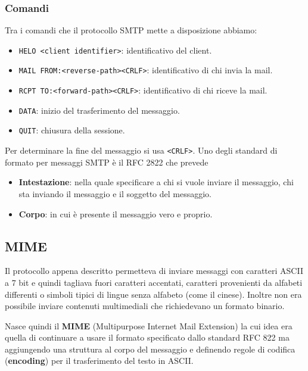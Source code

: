 \subsubsection{Comandi}
Tra i comandi che il protocollo SMTP mette a disposizione abbiamo:
\begin{itemize}
	\item \verb|HELO <client identifier>|: identificativo del client.
	\item \verb|MAIL FROM:<reverse-path><CRLF>|: identificativo di 
		chi invia la mail.
	\item \verb|RCPT TO:<forward-path><CRLF>|: identificativo di chi 
		riceve la mail.
	\item \verb|DATA|: inizio del trasferimento del messaggio.
	\item \verb|QUIT|: chiusura della sessione.
\end{itemize}
Per determinare la fine del messaggio si usa \verb|<CRLF>|. Uno degli 
standard di formato per messaggi SMTP è il RFC 2822 che prevede
\begin{itemize}
	\item \textbf{Intestazione}: nella quale specificare a chi si vuole
		inviare il messaggio, chi sta inviando il messaggio e il 
		soggetto del messaggio.
	\item \textbf{Corpo}: in cui è presente il messaggio vero e 
		proprio.
\end{itemize}

\subsection{MIME}
Il protocollo appena descritto permetteva di inviare messaggi con 
caratteri ASCII a 7 bit e quindi tagliava fuori caratteri accentati,
caratteri provenienti da alfabeti differenti o simboli tipici di lingue
senza alfabeto (come il cinese). Inoltre non era possibile inviare 
contenuti multimediali che richiedevano un formato binario.

Nasce quindi il \textbf{MIME} (Multipurpose Internet Mail Extension) la
cui idea era quella di continuare a usare il formato specificato dallo 
standard RFC 822 ma aggiungendo una struttura al corpo del messaggio e 
definendo regole di  codifica (\textbf{encoding}) per il trasferimento 
del testo in ASCII.

